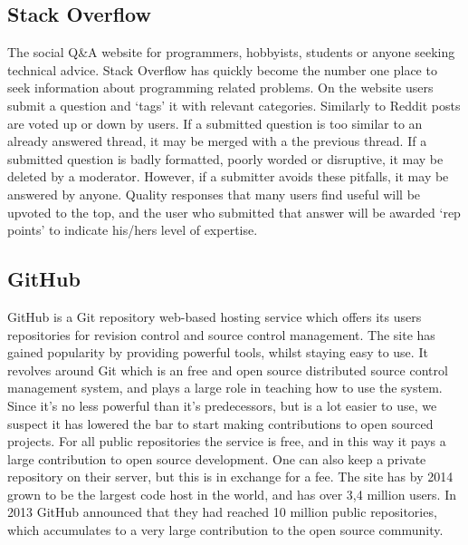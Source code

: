 \documentclass[a4paper,11pt]{article} %
\begin{document}
\subsection{Stack Overflow}

The social Q\&A website for programmers, hobbyists, students or anyone
seeking technical advice. Stack Overflow has quickly become the number one
place to seek information about programming related problems. On the website
users submit a question and ‘tags’ it with relevant categories.  Similarly
to Reddit posts are voted up or down by users. If a submitted question is
too similar to an already answered thread, it may be merged with a the
previous thread. If a submitted question is badly formatted, poorly worded
or disruptive, it may be deleted by a moderator.  However, if a submitter
avoids these pitfalls, it may be answered by anyone. Quality responses that
many users find useful will be upvoted to the top, and the user who
submitted that answer will be awarded ‘rep points’ to indicate his/hers
level of expertise.


\subsection{GitHub}

GitHub is a Git repository web-based hosting service which offers its users
repositories for revision control and source control management. The site
has gained popularity by providing powerful tools, whilst staying easy to
use. It revolves around Git which is an free and open source distributed
source control management system, and plays a large role in teaching how to
use the system. Since it’s no less powerful than it’s predecessors, but is a
lot easier to use, we suspect it has lowered the bar to start making
contributions to open sourced projects. For all public repositories the
service is free, and in this way it pays a large contribution to open source
development. One can also keep a private repository on their server, but
this is in exchange for a fee. The site has by 2014 grown to be the largest
code host in the world, and has over 3,4 million users. In 2013 GitHub
announced that they had reached 10 million public repositories, which
accumulates to a very large contribution to the open source community.
\end{document}
